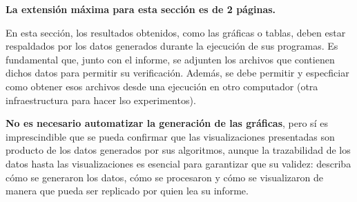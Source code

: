 \begin{mdframed}
    \textbf{La extensión máxima para esta sección es de 2 páginas.}
\end{mdframed}


En esta sección, los resultados obtenidos, como las gráficas o tablas, deben estar respaldados por los datos generados durante la ejecución de sus programas. Es fundamental que, junto con el informe, se adjunten los archivos que contienen dichos datos para permitir su verificación. Además, se debe permitir y especficiar como obtener esos archivos desde una ejecución en otro computador (otra infraestructura para hacer lso experimentos).

\textbf{No es necesario automatizar la generación de las gráficas}, pero sí es imprescindible que se pueda confirmar que las visualizaciones presentadas son producto de los datos generados por sus algoritmos, aunque la trazabilidad de los datos hasta las visualizaciones es esencial para garantizar que su validez: describa cómo se generaron los datos, cómo se procesaron y cómo se visualizaron de manera que pueda ser replicado por quien lea su informe.
